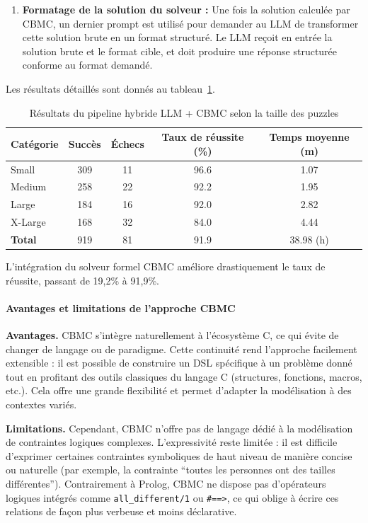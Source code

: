 \documentclass[a4paper,11pt]{article}
\begin{document}
\begin{enumerate}
    \item \textbf{Formatage de la solution du solveur :}  
    Une fois la solution calculée par CBMC, un dernier prompt est utilisé pour demander au LLM de transformer cette solution brute en un format structuré. Le LLM reçoit en entrée la solution brute et le format cible, et doit produire une réponse structurée conforme au format demandé.
\end{enumerate}

Les résultats détaillés sont donnés au tableau~\ref{tab:results-cbmc}.

\begin{table}[h!]
    \centering
    \caption{Résultats du pipeline hybride LLM + CBMC selon la taille des puzzles}
    \label{tab:results-cbmc}
    \begin{tabular}{lcccc}
        \toprule
        Catégorie & Succès & Échecs & Taux de réussite (\%) & Temps moyenne (m) \\
        \midrule
        Small    & 309 & 11  & \num{96.6} & 1.07 \\
        Medium   & 258 & 22  & \num{92.2} & 1.95 \\
        Large    & 184 & 16  & \num{92.0} & 2.82 \\
        X-Large  & 168 & 32  & \num{84.0} & 4.44 \\
        \midrule
        \textbf{Total}    & 919 & 81  & \num{91.9} & 38.98 (h) \\
        \bottomrule
    \end{tabular}
\end{table}

L'intégration du solveur formel CBMC améliore drastiquement le taux de réussite, passant de 19,2\% à 91,9\%.

\paragraph{Avantages et limitations de l'approche CBMC}

\textbf{Avantages.}  
CBMC s'intègre naturellement à l'écosystème C, ce qui évite de changer de langage ou de paradigme. Cette continuité rend l'approche facilement extensible : il est possible de construire un DSL spécifique à un problème donné tout en profitant des outils classiques du langage C (structures, fonctions, macros, etc.). Cela offre une grande flexibilité et permet d'adapter la modélisation à des contextes variés.

\textbf{Limitations.}  
Cependant, CBMC n’offre pas de langage dédié à la modélisation de contraintes logiques complexes. L'expressivité reste limitée : il est difficile d’exprimer certaines contraintes symboliques de haut niveau de manière concise ou naturelle (par exemple, la contrainte ``toutes les personnes ont des tailles différentes''). Contrairement à Prolog, CBMC ne dispose pas d’opérateurs logiques intégrés comme \texttt{all\_different/1} ou \texttt{\#==>}, ce qui oblige à écrire ces relations de façon plus verbeuse et moins déclarative.
\end{document}
